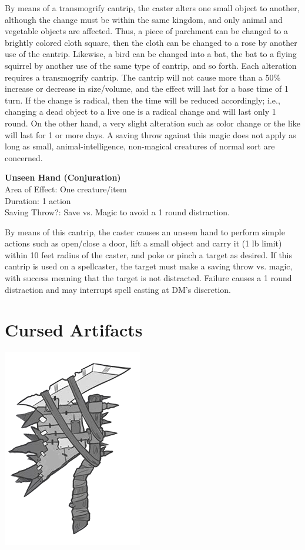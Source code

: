 \documentclass[letterpaper,sansserif,tightsqueeze]{rpg-module}
\begin{document}
By means of a transmogrify cantrip, the caster alters one small object to another, although the change must be within the same kingdom, and only animal and vegetable objects are affected. Thus, a piece of parchment can be changed to a brightly colored cloth square, then the cloth can be changed to a rose by another use of the cantrip. Likewise, a bird can be changed into a bat, the bat to a flying squirrel by another use of the same type of cantrip, and so forth. Each alteration requires a transmogrify cantrip. The cantrip will not cause more than a 50\% increase or decrease in size/volume, and the effect will last for a base time of 1 turn. If the change is radical, then the time will be reduced accordingly; i.e., changing a dead object to a live one is a radical change and will last only 1 round. On the other hand, a very slight alteration such as color change or the like will last for 1 or more days. A saving throw against this magic does not apply as long as small, animal-intelligence, non-magical creatures of normal sort are concerned.
	
\textbf{Unseen Hand (Conjuration)}\\
Area of Effect: One creature/item\\
Duration: 1 action\\
Saving Throw?: Save vs. Magic to avoid a 1 round distraction.
	
By means of this cantrip, the caster causes an unseen hand to perform simple actions such as open/close a door, lift a small object and carry it (1 lb limit) within 10 feet radius of the caster, and poke or pinch a target as desired.
If this cantrip is used on a spellcaster, the target must make a saving throw vs. magic, with success meaning that the target is not distracted. Failure causes a 1 round distraction and may interrupt spell casting at DM’s discretion.
\newpage

\vspace{0.5cm}
\part*{Cursed Artifacts}
\vspace{0.5cm}

\begin{center}
	\includegraphics[width = 0.5\linewidth]{Garthruks_axe.png}
\end{center}
\end{document}
